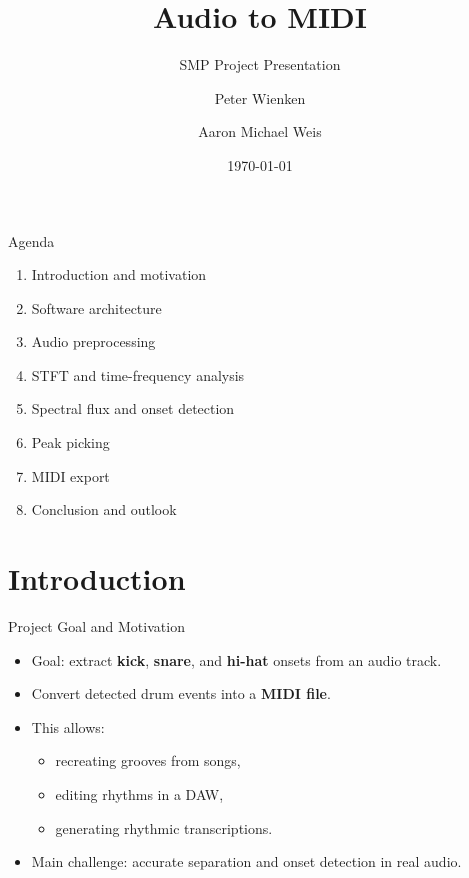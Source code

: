 \documentclass[aspectratio=169]{beamer}
\title{Audio to MIDI}
\subtitle{SMP Project Presentation}
\author{Peter Wienken \and Aaron Michael Weis}
\date{\today}
\begin{document}
\begin{frame}
    \titlepage
\end{frame}

\begin{frame}{Agenda}
    \begin{enumerate}
        \item Introduction and motivation
        \item Software architecture
        \item Audio preprocessing
        \item STFT and time-frequency analysis
        \item Spectral flux and onset detection
        \item Peak picking
        \item MIDI export
        \item Conclusion and outlook
    \end{enumerate}
\end{frame}

\section{Introduction}

\begin{frame}{Project Goal and Motivation}
    \begin{itemize}
        \item Goal: extract \textbf{kick}, \textbf{snare}, and \textbf{hi-hat} onsets from an audio track.
        \item Convert detected drum events into a \textbf{MIDI file}.
        \item This allows:
        \begin{itemize}
            \item recreating grooves from songs,
            \item editing rhythms in a DAW,
            \item generating rhythmic transcriptions.
        \end{itemize}
        \item Main challenge: accurate separation and onset detection in real audio.
    \end{itemize}
\end{frame}
\end{document}
